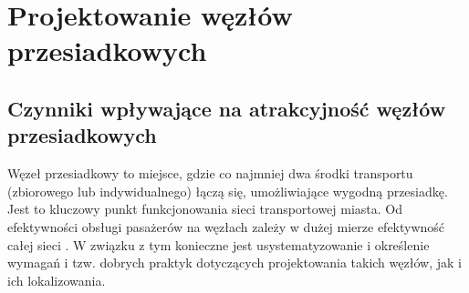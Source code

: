 \documentclass[twoside,12pt]{article}
\begin{document}
\clearpage
\section{Projektowanie węzłów przesiadkowych}

	\subsection{Czynniki wpływające na atrakcyjność węzłów przesiadkowych}

	Węzeł przesiadkowy to miejsce, gdzie co najmniej dwa środki transportu (zbiorowego lub indywidualnego) łączą się, umożliwiające wygodną przesiadkę. Jest to kluczowy punkt funkcjonowania sieci transportowej miasta. Od efektywności obsługi pasażerów na węzłach zależy w dużej mierze efektywność całej sieci \cite{urbanistyka}. W związku z tym konieczne jest usystematyzowanie i określenie wymagań i tzw. dobrych praktyk dotyczących projektowania takich węzłów, jak i ich lokalizowania. 
	
\end{document}
